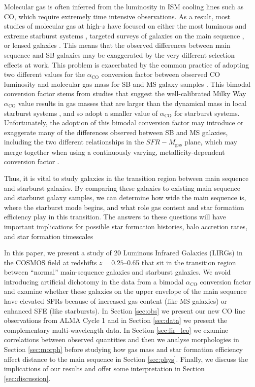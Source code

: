 \documentclass[a4paper,fleqn,usenatbib]{mnras}
\newcommand{\aco}{\alpha_{\mathrm{CO}}}
\begin{document}
Molecular gas is often inferred from the luminosity in ISM cooling lines such as CO, which require extremely time intensive observations. As a result, most studies of molecular gas at high-$z$ have focused on either the most luminous and extreme starburst systems \citep[e.g.][]{2005MNRAS.359.1165G,2006ApJ...640..228T,2008ApJ...680..246T,2013MNRAS.429.3047B}, targeted surveys of galaxies on the main sequence \citep{2010ApJ...714L.118D,2010MNRAS.407.2091G}, or lensed galaxies \citep[e.g.][]{2004ApJ...614L...5S,2010A&A...518L..35I,2011ApJ...739L..32R}. This means that the observed differences between main sequence and SB galaxies may be exaggerated by the very different selection effects at work. This problem is exacerbated by the common practice of adopting two different values for the $\aco$ conversion factor between observed CO luminosity and molecular gas mass for SB and MS galaxy samples \citep[see review in][]{2013ARA&A..51..207B}. This bimodal conversion factor stems from studies that suggest the well-calibrated Milky Way $\aco$ value results in gas masses that are larger than the dynamical mass in local starburst systems \citep{1999AJ....117.2632B}, and so adopt a smaller value of $\aco$ for starburst systems. Unfortunately, the adoption of this bimodal conversion factor may introduce or exaggerate many of the differences observed between SB and MS galaxies, including the two different relationships in the $SFR-M_{\mathrm{gas}}$ plane, which may merge together when using a continuously varying, metallicity-dependent conversion factor \cite[e.g.][]{2011MNRAS.418..664N}. 

Thus, it is vital to study galaxies in the transition region between main sequence and starburst galaxies. By comparing these galaxies to existing main sequence and starburst galaxy samples, we can determine how wide the main sequence is, where the starburst mode begins, and what role gas content and star formation efficiency play in this transition. The answers to these questions will have important implications for possible star formation histories, halo accretion rates, and star formation timescales \citep[e.g.][]{2014arXiv1406.5191K,2014ApJ...796...25S,2016arXiv160607436M}

In this paper, we present a study of 20 Luminous Infrared Galaxies (LIRGs) in the COSMOS field at redshifts $z = 0.25$--0.65 that sit in the transition region between ``normal'' main-sequence galaxies and starburst galaxies. We avoid introducing artificial dichotomy in the data from a bimodal $\aco$ conversion factor and examine whether these galaxies on the upper envelope of the main sequence have elevated SFRs because of increased gas content (like MS galaxies) or enhanced SFE (like starbursts). In Section \ref{sec:obs} we present our new CO line observations from ALMA Cycle 1 and in Section \ref{sec:data} we present the complementary multi-wavelength data. In Section \ref{sec:lir_lco} we examine correlations between observed quantities and then we analyse morphologies in Section \ref{sec:morph} before studying how gas mass and star formation efficiency affect distance to the main sequence in Section \ref{sec:phys}. Finally, we discuss the implications of our results and offer some interpretation in Section \ref{sec:discussion}. 
\end{document}
